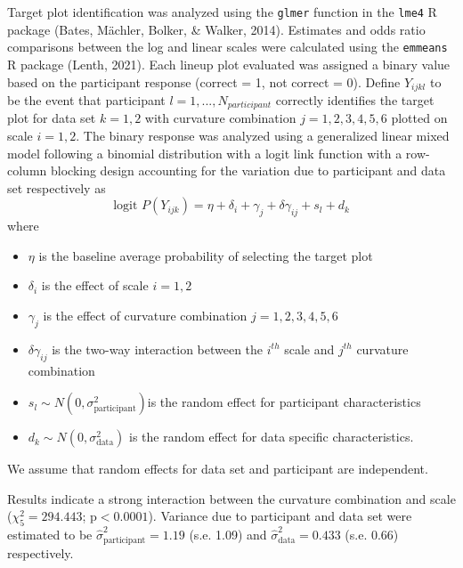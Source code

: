 \documentclass[print]{nuthesis}
\begin{document}
Target plot identification was analyzed using the \texttt{glmer} function in the \texttt{lme4} R package (Bates, Mächler, Bolker, \& Walker, 2014).
Estimates and odds ratio comparisons between the log and linear scales were calculated using the \texttt{emmeans} R package (Lenth, 2021).
Each lineup plot evaluated was assigned a binary value based on the participant response (correct = 1, not correct = 0).
Define \(Y_{ijkl}\) to be the event that participant \(l = 1,...,N_{participant}\) correctly identifies the target plot for data set \(k = 1,2\) with curvature combination \(j = 1,2,3,4,5,6\) plotted on scale \(i = 1,2\).
The binary response was analyzed using a generalized linear mixed model following a binomial distribution with a logit link function with a row-column blocking design accounting for the variation due to participant and data set respectively as
\begin{equation}
\text{logit }P(Y_{ijk}) = \eta + \delta_i + \gamma_j + \delta \gamma_{ij} + s_l + d_k
\end{equation}
\noindent where

\begin{itemize}
\item $\eta$ is the baseline average probability of selecting the target plot
\item $\delta_i$ is the effect of scale $i = 1,2$
\item $\gamma_j$ is the effect of curvature combination $j = 1,2,3,4,5,6$
\item $\delta\gamma_{ij}$ is the two-way interaction between the $i^{th}$ scale and $j^{th}$ curvature combination
\item $s_l \sim N(0,\sigma^2_\text{participant})$is the random effect for participant characteristics
\item $d_k \sim N(0,\sigma^2_{\text{data}})$ is the random effect for data specific characteristics. 
\end{itemize}

\noindent We assume that random effects for data set and participant are independent.

Results indicate a strong interaction between the curvature combination and scale (\(\chi^2_5 = 294.443\); \(\text{p} <0.0001\)). Variance due to participant and data set were estimated to be \(\hat\sigma^2_{\text{participant}} = 1.19\) (s.e. 1.09) and \(\hat\sigma^2_{\text{data}} = 0.433\) (s.e. 0.66) respectively.
\end{document}
